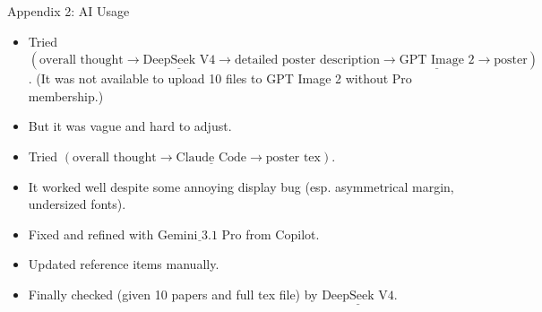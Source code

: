 \documentclass[final]{beamer}
\begin{document}
\begin{frame}[t]{Appendix 2: AI Usage}


\vspace{10cm}
\begin{center}
  \begin{minipage}{0.85\linewidth}
    \Large
    \setlength{\itemsep}{1.2cm}
    \begin{itemize}
      \item Tried $\left(\text{overall thought}\to \underline{\text{DeepSeek V4}} \to \text{detailed poster description}\to \underline{\text{GPT Image 2}}\to\text{poster}\right)$. (It was not available to upload 10 files to GPT Image 2 without Pro membership.)
      \item But it was vague and hard to adjust.
      \item Tried $\left(\text{overall thought}\to\underline{\text{Claude Code}}\to\text{poster tex}\right)$.
      \item It worked well despite some annoying display bug (esp. asymmetrical margin, undersized fonts).
      \item Fixed and refined with $\underline{\text{Gemini 3.1 Pro}}$ from Copilot.
      \item Updated reference items manually.
      \item Finally checked (given 10 papers and full tex file) by $\underline{\text{DeepSeek V4}}$.
    \end{itemize}
  \end{minipage}
\end{center}

\end{frame}
\end{document}
